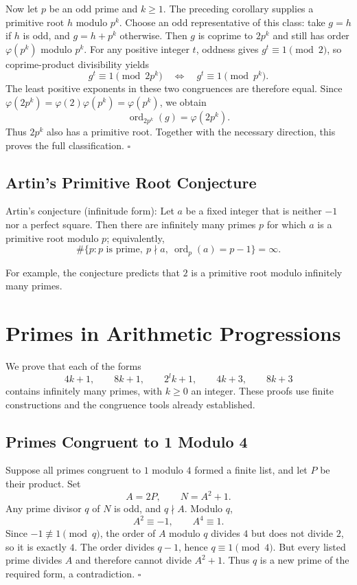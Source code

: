\documentclass[a4paper,11pt,abstracton]{scrartcl}
\theoremstyle{dotlessP}
\theoremstyle{dotlessS}
\theoremstyle{remark}
\theoremstyle{definition}
\begin{document}
Now let $p$ be an odd prime and $k\geq1$. The preceding corollary
supplies a primitive root $h$ modulo $p^k$. Choose an odd representative
of this class: take $g=h$ if $h$ is odd, and $g=h+p^k$ otherwise.
Then $g$ is coprime to $2p^k$ and still has order $\varphi(p^k)$
modulo $p^k$.
For any positive integer $t$, oddness gives $g^t\equiv1\pmod2$,
so coprime-product divisibility yields
\[
    g^t\equiv1\pmod{2p^k}
    \quad\Longleftrightarrow\quad g^t\equiv1\pmod{p^k}.
\]
The least positive exponents in these two congruences are therefore equal.
Since $\varphi(2p^k)=\varphi(2)\varphi(p^k)=\varphi(p^k)$, we obtain
\[
    \operatorname{ord}_{2p^k}(g)=\varphi(2p^k).
\]
Thus $2p^k$ also has a primitive root. Together with the necessary
direction, this proves the full classification.
\hfill$\square$

\subsection{Artin's Primitive Root Conjecture}

\begin{mainbox}{Artin's conjecture (infinitude form):}
Let $a$ be a fixed integer that is neither $-1$ nor a perfect square.
Then there are infinitely many primes $p$ for which $a$ is a primitive
root modulo $p$; equivalently,
\[
    \#\{p:p\text{ is prime},\ p\nmid a,\
             \operatorname{ord}_p(a)=p-1\}=\infty.
\]
\end{mainbox}

\begin{example_box}
For example, the conjecture predicts that $2$ is a primitive root
modulo infinitely many primes.
\end{example_box}

\section{Primes in Arithmetic Progressions}

We prove that each of the forms
\[
    4k+1, \qquad8k+1, \qquad2^{l}k+1,\qquad4k+3, \qquad8k+3
\]
contains infinitely many primes, with $k\geq0$ an integer.
These proofs use finite constructions and the congruence tools already
established.

\subsection{Primes Congruent to 1 Modulo 4}

Suppose all primes congruent to $1$ modulo $4$ formed a finite list,
and let $P$ be their product. Set
\[
    A=2P,\qquad N=A^2+1.
\]
Any prime divisor $q$ of $N$ is odd, and $q\nmid A$. Modulo $q$,
\[
    A^2\equiv-1,\qquad A^4\equiv1.
\]
Since $-1\not\equiv1\pmod q$, the order of $A$ modulo $q$ divides $4$
but does not divide $2$, so it is exactly $4$. The order divides $q-1$,
hence $q\equiv1\pmod4$.
But every listed prime divides $A$ and therefore cannot divide $A^2+1$.
Thus $q$ is a new prime of the required form, a contradiction.
\hfill$\square$
\end{document}
